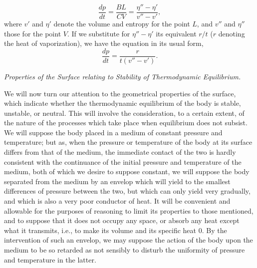 \documentclass[11pt]{article}
\begin{document}
\[
\frac{dp}{dt}=\frac{BL}{CV}=\frac{\eta''-\eta'}{v''-v'},
\]
where $v'$ and $\eta'$ denote the volume and entropy for the point $L$, and $v''$ and $\eta''$ those for the point $V$. If we substitute for $\eta''-\eta'$ its equivalent $r/t$ ($r$ denoting the heat of vaporization), we have the equation in its usual form,
\[
\frac{dp}{dt}=\frac{r}{t(v''-v')}.
\]

\begin{center}
\itshape Properties of the Surface relating to Stability of Thermodynamic Equilibrium.
\end{center}

We will now turn our attention to the geometrical properties of the surface, which indicate whether the thermodynamic equilibrium of the body is stable, unstable, or neutral. This will involve the consideration, to a certain extent, of the nature of the processes which take place when equilibrium does not subsist. We will suppose the body placed in a medium of constant pressure and temperature; but as, when the pressure or temperature of the body at its surface differs from that of the medium, the immediate contact of the two is hardly consistent with the continuance of the initial pressure and temperature of the medium, both of which we desire to suppose constant, we will suppose the body separated from the medium by an envelop which will yield to the smallest differences of pressure between the two, but which can only yield very gradually, and which is also a very poor conductor of heat. It will be convenient and allowable for the purposes of reasoning to limit its properties to those mentioned, and to suppose that it does not occupy any space, or absorb any heat except what it transmits, i.e., to make its volume and its specific heat $0$. By the intervention of such an envelop, we may suppose the action of the body upon the medium to be so retarded as not sensibly to disturb the uniformity of pressure and temperature in the latter.
\end{document}
